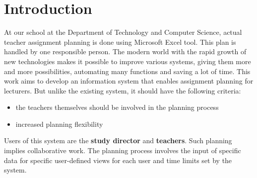 \documentclass{scrartcl}
\begin{document}
\section{Introduction}
At our school at the Department of Technology and Computer Science, actual teacher assignment planning is done using Microsoft Excel tool.
This plan is handled by one responsible person.
The modern world with the rapid growth of new technologies makes it possible to improve various systems, giving them more and more possibilities, automating many functions and saving a lot of time.
This work aims to develop an information system that enables assignment planning for lecturers. But unlike the existing system, it should have the following criteria:
\begin{itemize}
\item the teachers themselves should be involved in the planning process
\item increased planning flexibility
\end{itemize}




Users of this system are the \textbf{study director} and \textbf{teachers}. Such planning implies collaborative work.
The planning process involves the input of specific data for specific user-defined views for each user and time limits set by the system. 
\end{document}
